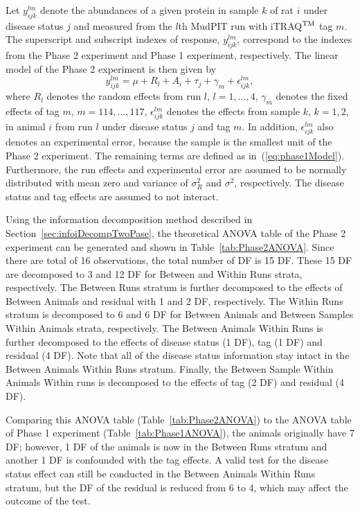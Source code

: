 \documentclass[article]{jss}
\begin{document}
Let $y_{ijk}^{lm}$ denote the abundances of a given protein in sample $k$ of rat $i$ under disease status $j$ and measured from the $l$th MudPIT run with iTRAQ$^{\rm TM}$ tag $m$. The superscript and subscript indexes of response, $y_{ijk}^{lm}$, correspond to the indexes from the Phase 2 experiment and Phase 1 experiment, respectively. The linear model of the Phase 2 experiment is then given by
\begin{equation}\label{eq:phase2Model}
y_{ijk}^{lm}= \mu + R_{l} + A_{i}+ \tau_{j} + \gamma_{m} + \epsilon_{ijk}^{lm},
\end{equation}
where $R_{l}$ denotes the random effects from run $l$,  $l=1,\dots, 4$, $\gamma_{m}$ denotes the fixed effects of tag $m$, $m = 114,\dots, 117$, $\epsilon_{ijk}^{lm}$ denotes the effects from sample $k$, $k = 1, 2$, in animal $i$ from run $l$ under disease status $j$ and tag $m$. In addition, $\epsilon_{ijk}^{lm}$ also denotes an experimental error, because the sample is the smallest unit of the Phase 2 experiment. The remaining terms are defined as in~(\ref{eq:phase1Model}). Furthermore, the run effects and experimental error are assumed to be normally distributed with mean zero and variance of $\sigma_{R}^2$ and $\sigma^2$, respectively. The disease status and tag effects are assumed to not interact. 

Using the information decomposition method described in Section~\ref{sec:infoiDecompTwoPase}, the theoretical ANOVA table of the Phase 2 experiment can be generated and shown in Table~\ref{tab:Phase2ANOVA}. Since there are total of 16 observations, the total number of DF is 15 DF. These 15 DF are decomposed to 3 and 12 DF for Between and Within Runs strata, respectively. The Between Runs stratum is further decomposed to the effects of Between Animals and residual with 1 and 2 DF, respectively. The Within Runs stratum is decomposed to 6 and 6 DF for Between Animals and Between Samples Within Animals strata, respectively. The Between Animals Within Runs is further decomposed to the effects of disease status (1 DF), tag (1 DF) and residual (4 DF). Note that all of the disease status information stay intact in the Between Animals Within Runs stratum. Finally, the Between Sample Within Animals Within runs is decomposed to the effects of tag (2 DF) and residual (4 DF).

Comparing this ANOVA table (Table~\ref{tab:Phase2ANOVA}) to the ANOVA table of Phase 1 experiment (Table~\ref{tab:Phase1ANOVA}), the animals originally have 7 DF; however, 1 DF of the animals is now in the Between Runs stratum and another 1 DF is confounded with the tag effects. A valid test for the disease status effect can still be conducted in the Between Animals Within Runs stratum, but the DF of the residual is reduced from 6 to 4, which may affect the outcome of the test.
\end{document}
